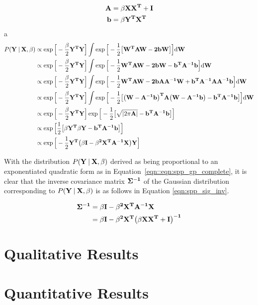\begin{align}
  \label{eqn:spp_gp_marginal_change}
  \bf{A} &= \beta \bf{XX}^{T} + \bf{I}\\
  \bf{b} &= \beta \bf{Y}^{T} \bf{X}^{T}
\end{align}
a
\begin{align}
  \label{eqn:spp_gp_complete}
  P(\bf{Y} \:\vert\: \bf{X}, \beta) 
  &\propto \exp{\Big[ -\frac{\beta}{2}\bf{Y}^{T}\bf{Y} \Big]}
  \int \exp{\Big[ -\frac{1}{2} 
  \big[
    \bf{W}^{T}\bf{AW} - 2\bf{bW}  
  \big]
  \Big]} {\mathrm d{\bf{W}}}\\
  &\propto \exp{\Big[ -\frac{\beta}{2}\bf{Y}^{T}\bf{Y} \Big]}
  \int \exp{\Big[ 
    -\frac{1}{2} \bf{W}^{T}\bf{AW} 
    - 2\bf{bW} 
    - \bf{b}^{T}\bf{A}^{-1}\bf{b}  
  \Big]} {\mathrm d{\bf{W}}}\\
  &\propto \exp{\Big[ -\frac{\beta}{2}\bf{Y}^{T}\bf{Y} \Big]}
  \int \exp{\Big[ 
    -\frac{1}{2} \bf{W}^{T}\bf{AW} 
    - 2\bf{bA}\bf{A}^{-1}\bf{W}
    + \bf{b}^{T}\bf{A}^{-1}\bf{AA}^{-1}\bf{b}  
  \Big]} {\mathrm d{\bf{W}}}\\
  &\propto \exp{\Big[ -\frac{\beta}{2}\bf{Y}^{T}\bf{Y} \Big]}
  \int \exp{\Big[ -\frac{1}{2} \big[ 
      \big( \bf{W} - \bf{A}^{-1}\bf{b} \big)^{T}
      \bf{A}
      \big( \bf{W} - \bf{A}^{-1}\bf{b} \big)
      - \bf{b}^{T}\bf{A}^{-1}\bf{b}
    \big]
  \Big]} {\mathrm d{\bf{W}}}\\
  &\propto \exp{\Big[ -\frac{\beta}{2}\bf{Y}^{T}\bf{Y} \Big]}
  \exp{\Big[ -\frac{1}{2} \big[
      \sqrt{\left| 2 \pi \bf{A} \right|}
      - \bf{b}^{T}\bf{A}^{-1}\bf{b}
    \big]
  \Big]}\\
  &\propto \exp{\Big[ \frac{1}{2} \big[
    \beta \bf{Y}^{T} \beta \bf{Y}
    - \bf{b}^{T}\bf{A}^{-1}\bf{b}
    \big]
  \Big]}\\
  &\propto \exp{\Big[ -\frac{1}{2}
  \bf{Y}^{T} \big(
    \beta \bf{I} - \beta^{2}\bf{X}^{T}\bf{A}^{-1}\bf{X}
    \big)\bf{Y}
  \Big]}
\end{align}

With the distribution $P(\bf{Y} \:\vert\: \bf{X}, \beta)$ derived as being proportional to  
an exponentiated quadratic form as in Equation~\ref{eqn::eqn:spp_gp_complete}, it is 
clear that the inverse covariance matrix $\bf{\Sigma}^{-1}$ of the Gaussian distribution 
corresponding to $P(\bf{Y} \:\vert\: \bf{X}, \beta)$ is as follows in Equation 
\ref{eqn:spp_sig_inv}.

\begin{align}
  \label{eqn:spp_sig_inv}
  \bf{\Sigma}^{-1} &= \beta \bf{I} - \beta^{2} \bf{X}^{T} \bf{A}^{-1} \bf{X}\\
  &= \beta \bf{I} - \beta^{2} \bf{X}^{T} \big(\beta \bf{XX}^{T} + \bf{I} \big)^{-1}
\end{align}

\section{Qualitative Results}
\label{sec:spp_qualitative}

\section{Quantitative Results}
\label{sec:spp_quantitative}
